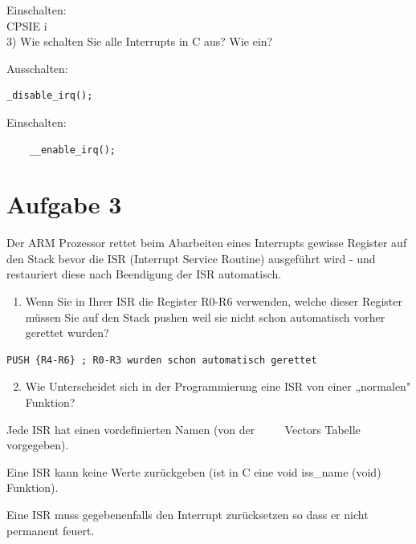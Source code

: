 \documentclass[10pt]{article}
\begin{document}
Einschalten:\\
CPSIE i\\
3) Wie schalten Sie alle Interrupts in C aus? Wie ein?

Ausschalten:

\begin{verbatim}
_disable_irq();
\end{verbatim}

Einschalten:

\begin{verbatim}
    __enable_irq();
\end{verbatim}

\section*{Aufgabe 3}
Der ARM Prozessor rettet beim Abarbeiten eines Interrupts gewisse Register auf den Stack bevor die ISR (Interrupt Service Routine) ausgeführt wird - und restauriert diese nach Beendigung der ISR automatisch.

\begin{enumerate}
  \item Wenn Sie in Ihrer ISR die Register R0-R6 verwenden, welche dieser Register müssen Sie auf den Stack pushen weil sie nicht schon automatisch vorher gerettet wurden?
\end{enumerate}

\begin{verbatim}
PUSH {R4-R6} ; R0-R3 wurden schon automatisch gerettet
\end{verbatim}

\begin{enumerate}
  \setcounter{enumi}{1}
  \item Wie Unterscheidet sich in der Programmierung eine ISR von einer „normalen" Funktion?
\end{enumerate}

Jede ISR hat einen vordefinierten Namen (von der $\qquad$ Vectors Tabelle vorgegeben).

Eine ISR kann keine Werte zurückgeben (ist in C eine void iss\_name (void) Funktion).

Eine ISR muss gegebenenfalls den Interrupt zurücksetzen so dass er nicht permanent feuert.
\end{document}
